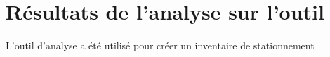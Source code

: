 \section{Résultats de l'analyse sur l'outil}\label{sec:analyse_stationnement}
L'outil d'analyse a été utilisé pour créer un inventaire de stationnement 